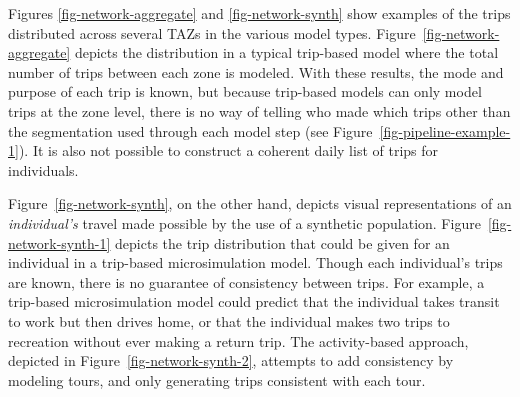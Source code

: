 \documentclass[fancy, oneside, mastersfancy, ms]{byuthesis}
\begin{document}
Figures \ref{fig-network-aggregate} and \ref{fig-network-synth} show
examples of the trips distributed across several TAZs in the various
model types. Figure~\ref{fig-network-aggregate} depicts the distribution
in a typical trip-based model where the total number of trips between
each zone is modeled. With these results, the mode and purpose of each
trip is known, but because trip-based models can only model trips at the
zone level, there is no way of telling who made which trips other than
the segmentation used through each model step (see
Figure~\ref{fig-pipeline-example-1}). It is also not possible to
construct a coherent daily list of trips for individuals.

Figure~\ref{fig-network-synth}, on the other hand, depicts visual
representations of an \emph{individual's} travel made possible by the
use of a synthetic population. Figure~\ref{fig-network-synth-1} depicts
the trip distribution that could be given for an individual in a
trip-based microsimulation model. Though each individual's trips are
known, there is no guarantee of consistency between trips. For example,
a trip-based microsimulation model could predict that the individual
takes transit to work but then drives home, or that the individual makes
two trips to recreation without ever making a return trip. The
activity-based approach, depicted in Figure~\ref{fig-network-synth-2},
attempts to add consistency by modeling tours, and only generating trips
consistent with each tour.
\end{document}
